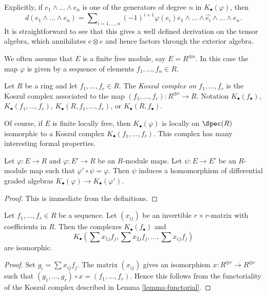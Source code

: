 \noindent
Explicitly, if $e_1 \wedge \ldots \wedge e_n$ is one of the generators of
degree $n$ in $K_\bullet(\varphi)$, then
$$
d(e_1 \wedge \ldots \wedge e_n) =
\sum\nolimits_{i = 1, \ldots, n} (-1)^{i + 1}
\varphi(e_i)e_1 \wedge \ldots \wedge \widehat{e_i} \wedge \ldots \wedge e_n.
$$
It is straightforward to see that this gives a well defined derivation
on the tensor algebra, which annihilates $e \otimes e$ and hence factors
through the exterior algebra.

\medskip\noindent
We often assume that $E$ is a finite free module, say $E = R^{\oplus n}$.
In this case the map $\varphi$ is given by a sequence of elements
$f_1, \ldots, f_n \in R$.

\begin{definition}
\label{definition-koszul-complex}
Let $R$ be a ring and let $f_1, \ldots, f_r \in R$. The
{\it Koszul complex on $f_1, \ldots, f_r$} is the Koszul complex
associated to the map $(f_1, \ldots, f_r) : R^{\oplus r} \to R$.
Notation $K_\bullet(f_\bullet)$, $K_\bullet(f_1, \ldots, f_r)$,
$K_\bullet(R, f_1, \ldots, f_r)$, or $K_\bullet(R, f_\bullet)$.
\end{definition}

\noindent
Of course, if $E$ is finite locally free, then $K_\bullet(\varphi)$ is
locally on $\Spec(R)$ isomorphic to a Koszul complex
$K_\bullet(f_1, \ldots, f_r)$.
This complex has many interesting formal properties.

\begin{lemma}
\label{lemma-functorial}
Let $\varphi : E \to R$ and $\varphi : E' \to R$ be an $R$-module maps.
Let $\psi : E \to E'$ be an $R$-module map such that
$\varphi' \circ \psi = \varphi$. Then $\psi$ induces a
homomorphism of differential graded algebras
$K_\bullet(\varphi) \to K_\bullet(\varphi')$.
\end{lemma}

\begin{proof}
This is immediate from the definitions.
\end{proof}

\begin{lemma}
\label{lemma-change-basis}
Let $f_1, \ldots, f_r \in R$ be a sequence.
Let $(x_{ij})$ be an invertible $r \times r$-matrix with
coefficients in $R$. Then the complexes
$K_\bullet(f_\bullet)$ and
$$
K_\bullet(\sum x_{1j}f_j, \sum x_{2j}f_j, \ldots, \sum x_{cj}f_j)
$$
are isomorphic.
\end{lemma}

\begin{proof}
Set $g_i = \sum x_{ij}f_j$.
The matrix $(x_{ij})$ gives an isomorphism $x : R^{\oplus r} \to R^{\oplus r}$
such that $(g_1, \ldots, g_r) \circ x = (f_1, \ldots, f_r)$.
Hence this follows from the functoriality of the Koszul complex
described in
Lemma \ref{lemma-functorial}.
\end{proof}

